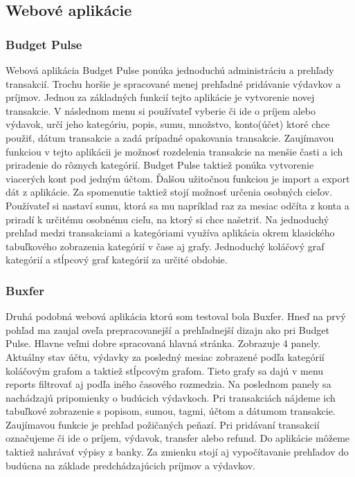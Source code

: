 \documentclass[12pt,onesided]{book}
\begin{document}
\subsection{Webové aplikácie}
\subsubsection{Budget Pulse \cite{BudgetPulse}\ }

Webová aplikácia Budget Pulse ponúka jednoduchú administráciu a prehľady transakcií. Trochu horšie je spracované menej prehľadné pridávanie výdavkov a príjmov. Jednou za základných funkcií tejto aplikácie je vytvorenie novej transakcie. V následnom menu si používateľ vyberie či ide o príjem alebo výdavok, určí jeho kategóriu, popis, sumu, množstvo, konto(účet) ktoré chce použiť, dátum transakcie a zadá prípadné opakovania transakcie. Zaujímavou funkciou v tejto aplikácii je možnosť rozdelenia transakcie na menšie časti a ich priradenie do rôznych kategórií. Budget Pulse taktiež ponúka vytvorenie viacerých kont pod jedným účtom. Ďalšou užitočnou funkciou je import a export dát z aplikácie. Za spomenutie taktiež stojí možnosť určenia osobných cieľov. Používateľ si nastaví sumu, ktorá sa mu napríklad raz za mesiac odčíta z konta a priradí k určitému osobnému cieľu, na ktorý si chce našetriť. Na jednoduchý prehľad medzi transakciami a kategóriami využíva aplikácia okrem klasického tabuľkového zobrazenia kategórií v čase aj grafy. Jednoduchý koláčový graf kategórií a stĺpcový graf kategórií za určité obdobie.



\subsubsection{Buxfer \cite{Buxfer}\ }

Druhá podobná webová aplikácia ktorú som testoval bola Buxfer. Hneď na prvý pohľad ma zaujal oveľa prepracovanejší a prehľadnejší dizajn ako pri Budget Pulse. Hlavne veľmi dobre spracovaná hlavná stránka. Zobrazuje 4 panely. Aktuálny stav účtu, výdavky za posledný mesiac zobrazené podľa kategórií koláčovým grafom a taktiež stĺpcovým grafom. Tieto grafy sa dajú v menu reports filtrovať aj podľa iného časového rozmedzia. Na poslednom panely sa nachádzajú pripomienky o budúcich výdavkoch. Pri transakciách nájdeme ich tabuľkové zobrazenie s popisom, sumou, tagmi, účtom a dátumom transakcie. Zaujímavou funkcie je prehľad požičaných peňazí. Pri pridávaní transakcií označujeme či ide o príjem, výdavok, transfer alebo refund. Do aplikácie môžeme taktiež nahrávať výpisy z banky. Za zmienku stojí aj vypočítavanie prehľadov do budúcna na základe predchádzajúcich príjmov a výdavkov.
\end{document}
